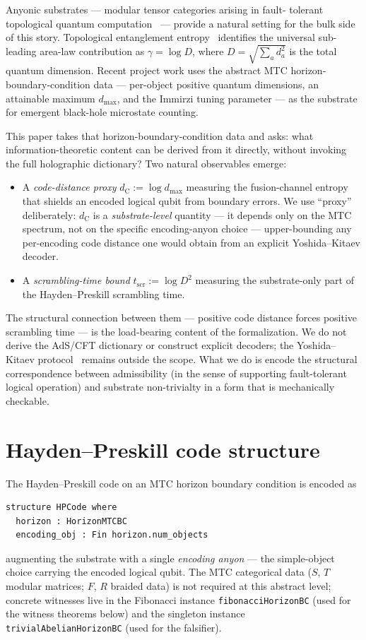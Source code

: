 \documentclass[twocolumn]{revtex4-2}
\newcommand{\dC}{d_{\mathrm{C}}}
\newcommand{\Dsq}{D^{2}}
\newcommand{\dmax}{d_{\max}}
\newcommand{\Tscr}{t_{\mathrm{scr}}}
\begin{document}
Anyonic substrates --- modular tensor categories arising in fault-
tolerant topological quantum computation~\cite{KitaevAnyons2003,
NayakAnyons2008} --- provide a natural setting for the bulk side of
this story. Topological entanglement entropy~\cite{KitaevPreskill2006}
identifies the universal sub-leading area-law contribution as
$\gamma = \log D$, where $D = \sqrt{\sum_a d_a^2}$ is the total
quantum dimension. Recent project work uses the abstract MTC
horizon-boundary-condition data --- per-object positive quantum
dimensions, an attainable maximum $\dmax$, and the Immirzi tuning
parameter --- as the substrate for emergent black-hole microstate
counting.

This paper takes that horizon-boundary-condition data and asks: what
information-theoretic content can be derived from it directly, without
invoking the full holographic dictionary? Two natural observables
emerge:

\begin{itemize}
\item A \emph{code-distance proxy} $\dC := \log \dmax$ measuring the
fusion-channel entropy that shields an encoded logical qubit from
boundary errors. We use ``proxy'' deliberately: $\dC$ is a
\emph{substrate-level} quantity --- it depends only on the MTC
spectrum, not on the specific encoding-anyon choice ---
upper-bounding any per-encoding code distance one would obtain from
an explicit Yoshida--Kitaev decoder.
\item A \emph{scrambling-time bound} $\Tscr := \log \Dsq$ measuring
the substrate-only part of the Hayden--Preskill scrambling time.
\end{itemize}

The structural connection between them --- positive code distance
forces positive scrambling time --- is the load-bearing content of the
formalization. We do not derive the AdS/CFT dictionary or construct
explicit decoders; the Yoshida--Kitaev protocol~\cite{YoshidaKitaev2017}
remains outside the scope. What we do is encode the structural
correspondence between admissibility (in the sense of supporting
fault-tolerant logical operation) and substrate non-trivialty in a
form that is mechanically checkable.

\section{Hayden--Preskill code structure}
\label{sec:hpcode}

The Hayden--Preskill code on an MTC horizon boundary condition is
encoded as
\begin{verbatim}
structure HPCode where
  horizon : HorizonMTCBC
  encoding_obj : Fin horizon.num_objects
\end{verbatim}
augmenting the substrate with a single \emph{encoding anyon} --- the
simple-object choice carrying the encoded logical qubit. The MTC
categorical data ($S$, $T$ modular matrices; $F$, $R$ braided data) is
not required at this abstract level; concrete witnesses live in the
Fibonacci instance \texttt{fibonacciHorizonBC} (used for the
witness theorems below) and the singleton instance
\texttt{trivialAbelianHorizonBC} (used for the falsifier).
\end{document}
